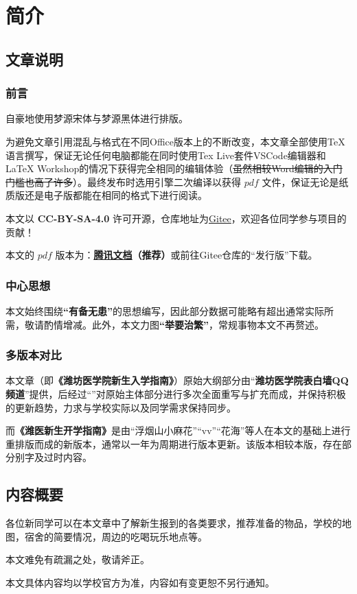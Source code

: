 \chapter[简介]{简介\vspace{-2em}}
\section[文章说明]{文章说明}
\vspace{-1em}
\subsection[前言]{前言}
\vspace{-1em}
自豪地使用梦源宋体与梦源黑体进行排版。

为避免文章引用混乱与格式在不同Office版本上的不断改变，本文章全部使用\TeX 语言撰写，保证无论任何电脑都能在同时使用Tex Live套件VSCode编辑器和LaTeX Workshop的情况下获得完全相同的编辑体验（\sout{虽然相较Word编辑的入门门槛也高了许多}）。最终发布时选用\XeLaTeX 引擎二次编译以获得 $pdf$ 文件，保证无论是纸质版还是电子版都能在相同的格式下进行阅读。

本文以 \textbf{CC-BY-SA-4.0} 许可开源，仓库地址为\uline{\href{https://gitee.com/mikazo/guide_for_freshman}{Gitee}}，欢迎各位同学参与项目的贡献！

本文的 $pdf$ 版本\textbf{}为：\textbf{\uline{\href{https://docs.qq.com/s/ETcQ-ZFSrSsh6MK9bm773q}{腾讯文档}}（推荐）}或前往Gitee仓库的“发行版”下载。

\subsection[中心思想]{中心思想}
\vspace{-1em}
本文始终围绕\textbf{“有备无患”}的思想编写，因此部分数据可能略有超出通常实际所需，敬请酌情增减。此外，本文力图\textbf{“举要治繁”}，常规事物本文不再赘述。

\subsection[多版本对比]{多版本对比}
\vspace{-1em}
本文章（即\textbf{《潍坊医学院新生入学指南》}）原始大纲部分由“\textbf{潍坊医学院表白墙QQ频道}”提供，后经过“\textbf{}”对原始主体部分进行多次全面重写与扩充而成，并保持积极的更新趋势，力求与学校实际以及同学需求保持同步。

而\textbf{《潍医新生开学指南》}是由“浮烟山小麻花”“vv”“花海”等人在本文的基础上进行重排版而成的新版本，通常以一年为周期进行版本更新。该版本相较本版，存在部分别字及过时内容。

\textbf{}

\section[内容概要]{内容概要}
\vspace{-1em}

各位新同学可以在本文章中了解新生报到的各类要求，推荐准备的物品，学校的地图，宿舍的简要情况，周边的吃喝玩乐地点等。

本文难免有疏漏之处，敬请斧正。

本文具体内容均以学校官方为准，内容如有变更恕不另行通知。